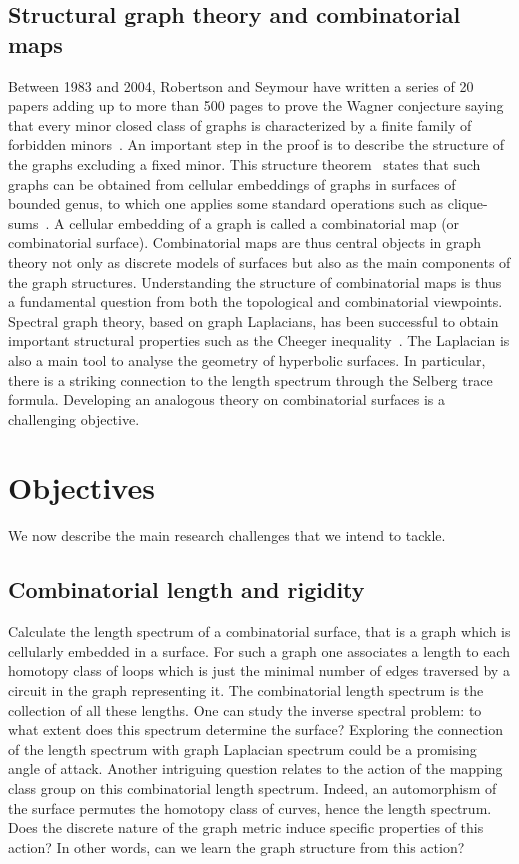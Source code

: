 \documentclass[14pt,fleqn]{article}
\begin{document}
\subsection{Structural graph theory and combinatorial maps}
Between 1983 and 2004, Robertson and Seymour have written a series of 20 papers adding up to more than 500 pages to prove the Wagner conjecture saying that every minor closed class of graphs is characterized by a finite family of forbidden minors~\cite{w-gt-70}.  An important step in the proof is to describe the structure of the graphs excluding a fixed minor. This structure theorem~\cite{rs-tv-99} states that such graphs can be obtained from cellular embeddings of graphs in surfaces of bounded genus, to which one applies some standard operations such as clique-sums~\cite{l-gmt-06}. A cellular embedding of a graph is called a combinatorial map (or combinatorial surface). Combinatorial maps are thus central objects in graph theory not only as discrete models of surfaces but also as the main components of the graph structures. Understanding the structure of combinatorial maps is thus a fundamental question from both the topological and combinatorial viewpoints. Spectral graph theory, based on graph Laplacians, has been successful to obtain important structural properties such as the Cheeger inequality~\cite{c-lbsel-70}. The Laplacian is also a main tool to analyse the geometry of hyperbolic surfaces. In particular, there is a striking connection to the length spectrum through the Selberg trace formula. Developing an analogous theory on combinatorial surfaces is a challenging objective.

\section{Objectives}
We now describe the main research challenges that we intend to tackle. 


\subsection{Combinatorial length and rigidity}
 Calculate the length
spectrum of a combinatorial surface, that is a graph which is
cellularly embedded in a surface.  For such a graph one associates a
length to each homotopy class of loops which is just the minimal
number of edges traversed by a circuit in the graph representing
it. The combinatorial length spectrum is the collection of all these
lengths. One can study the inverse spectral problem: to what extent
does this spectrum determine the surface? Exploring the connection of the length spectrum with graph Laplacian spectrum could be a promising angle of attack. Another intriguing question relates to the action of the mapping class group on this combinatorial length spectrum. Indeed, an automorphism of the
 surface permutes the homotopy class of curves, hence the length spectrum. Does the discrete nature of the graph metric induce specific properties of this action? In other words, can we learn the graph structure from this action?
\end{document}
